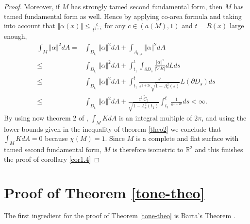 \documentclass[a4paper]{amsart}
\theoremstyle{definition}
\numberwithin{equation}{section}
\begin{document}
\begin{proof}
Moreover, if $M$ has strongly tamed second fundamental form, then $M$ has  tamed fundamental form as well. Hence by applying co-area formula and taking into account that $\Vert \alpha(x)\Vert\leq \frac{c}{t^{1+\epsilon}}$ for any $c\in (a(M),1)$ and $t=R(x)$ large enough,
\begin{equation}
\begin{aligned}
\int_M\Vert \alpha\Vert^2 dA=&\int_{D_{t_1}}\Vert \alpha\Vert^2 dA+\int_{A_{t_1,t}}\Vert \alpha\Vert^2 dA\\
\leq & \int_{D_{t_1}}\Vert \alpha\Vert^2 dA+\int_{t_1}^t\int_{\partial D_s}\frac{\Vert \alpha\Vert^2}{\vert \nabla R\vert} dLds\\
\leq & \int_{D_{t_1}}\Vert \alpha\Vert^2 dA+\int_{t_1}^t\frac{c^2}{s^{2+2\epsilon}\sqrt{1-\Lambda_c^2(s)}}L(\partial D_s)ds\\
\leq & \int_{D_{t_1}}\Vert \alpha\Vert^2 dA+\frac{c^2\, \widetilde C_1}{\sqrt{1-\Lambda_c^2(t_1)}}\int_{t_1}^t\frac{1}{s^{1+2\epsilon}}ds<\infty.
\end{aligned}
\end{equation}
By using now theorem 2 of \cite{W}, $\int_M KdA$ is an integral multiple of $2\pi$, and using the lower bounds given  in the inequality of  theorem \ref{theo2} we conclude that $\int_M KdA=0$ because $\chi(M)=1$. Since $M$ is a complete and flat surface with  tamed second fundamental form, $M$ is therefore isometric to ${\mathbb{R}}^2$ and this finishes the proof of corollary \ref{cor1.4}
\end{proof}
\section{ Proof of Theorem \ref{tone-theo}}

 The first ingredient for the proof of Theorem
\ref{tone-theo} is  Barta's Theorem \cite{barta}.
\end{document}
